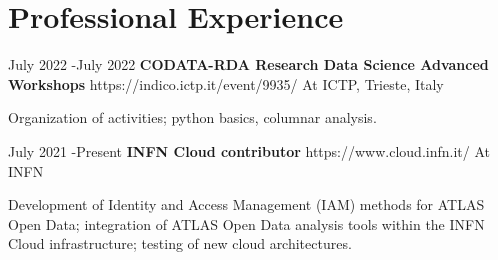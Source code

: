 \documentclass[10pt]{article} %
\begin{document}



\vspace{15mm}


\section{Professional Experience}

\job
{July  2022 -}{July  2022}
{\textbf{CODATA-RDA Research Data Science Advanced Workshops}}
{https://indico.ictp.it/event/9935/}
{At ICTP, Trieste, Italy}
{\begin{minipage}[c][][b]{0,7\textwidth}
Organization of activities; python basics, columnar analysis.
\end{minipage}
}


\job
{July 2021 -}{Present}
{\textbf{INFN Cloud contributor}}
{https://www.cloud.infn.it/}
{At INFN}
{\begin{minipage}[c][][b]{0,7\textwidth}
 Development of Identity and Access Management (IAM) methods for ATLAS Open Data; integration of ATLAS Open Data analysis tools within the INFN Cloud infrastructure; testing of new cloud architectures.
 \end{minipage}
}
\end{document}
